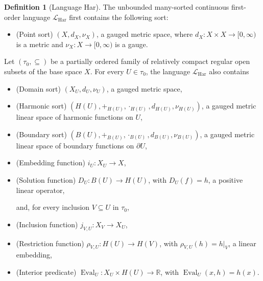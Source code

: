 \documentclass{amsart}
\theoremstyle{definition}
\newtheorem{definition}{Definition}[section]
\theoremstyle{remark}
\numberwithin{equation}{section}
\begin{document}
	
	\begin{definition}[Language Har]
		The unbounded many-sorted continuous first-order language
		$\mathcal L_{\mathrm{Har}}$ first contains the following sort:
		
		\begin{itemize}
			
			\item (Point sort) $(X,d_X,\nu_X)$, a gauged metric space, where $d_X:X\times X\to[0,\infty)$ is a metric and $\nu_X:X\to[0,\infty)$ is a gauge.
			
		\end{itemize}
		Let $(\tau_0,\subseteq)$ be a partially ordered family of relatively compact regular open subsets of the base space $X$. For every $U\in\tau_0$, the language $\mathcal L_{\mathrm{Har}}$ also contains
		
		\begin{itemize}
			\item (Domain sort) $(X_U,d_U,\nu_U)$, a gauged metric space,
			
			\item (Harmonic sort)
			$(H(U),+_{H(U)},\cdot_{H(U)},d_{H(U)},\nu_{H(U)})$, a gauged metric linear space of harmonic functions on $U$,
			
			\item (Boundary sort) $(B(U),+_{B(U)},\cdot_{B(U)},d_{B(U)},\nu_{B(U)})$, a gauged metric linear space of boundary functions on $\partial U$,
			
			\item (Embedding function) $i_U:X_U\to X$,
			
			\item (Solution function) $D_U:B(U)\to H(U)$, with $D_U(f)=h$, a positive linear operator,
			
			and, for every inclusion $V\subseteq U$ in $\tau_0$,
			
			\item (Inclusion function) $j_{V,U}:X_V\to X_U$,
			
			\item (Restriction function) $\rho_{V,U}:H(U)\to H(V)$, with $\rho_{V,U}(h)=h|_V$, a linear embedding,
			
			\item (Interior predicate) 
			$\operatorname{Eval}_U:X_U\times H(U)
			\to
			\mathbb R$, with
			$\operatorname{Eval}_U(x,h)=h(x)$.
		\end{itemize}
	\end{definition}
	
\end{document}
